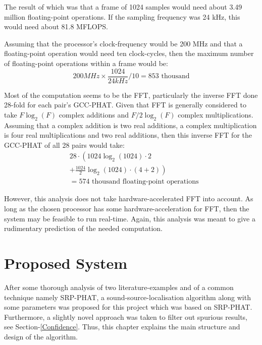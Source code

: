 \documentclass[notitlepage]{report}
\begin{document}
The result of which was that a frame of 1024 samples would need about 3.49 million floating-point operations. If the sampling frequency was 24 \si{kHz}, this would need about 81.8 MFLOPS.

Assuming that the processor's clock-frequency would be 200 \si{MHz} and that a floating-point operation would need ten clock-cycles, then the maximum number of floating-point operations within a frame would be:
\begin{equation}
200 \si{MHz} \times \frac{1024}{24 \si{kHz}} / 10 = 853 \text{ thousand}
\end{equation}

Most of the computation seems to be the FFT, particularly the inverse FFT done 28-fold for each pair's GCC-PHAT. Given that FFT is generally considered to take $F \log_2(F)$ complex additions and $F/2 \log_2(F)$ complex multiplications. Assuming that a complex addition is two real additions, a complex multiplication is four real multiplications and two real additions, then this inverse FFT for the GCC-PHAT of all 28 pairs would take:
\begin{equation}
\begin{split}
&28 \cdot \left( 1024 \log_2(1024) \cdot 2 \right. \\
&\left. + \frac{1024}{2} \log_2(1024) \cdot (4+2) \right) \\
&= 574 \text{ thousand floating-point operations}
\end{split}
\end{equation}

However, this analysis does not take hardware-accelerated FFT into account. As long as the chosen processor has some hardware-acceleration for FFT, then the system may be feasible to run real-time. Again, this analysis was meant to give a rudimentary prediction of the needed computation.

\chapter{Proposed System}

After some thorough analysis of two literature-examples and of a common technique namely SRP-PHAT\cite{valin_localization_2004}\cite{valin_robust_2007}\cite{manamperi_drone_2022}\cite{salvati_power_2019}\cite{basiri_-board_2016}, a sound-source-localisation algorithm along with some parameters was proposed for this project which was based on SRP-PHAT. Furthermore, a slightly novel approach was taken to filter out spurious results, see Section-\ref{Confidence}. Thus, this chapter explains the main structure and design of the algorithm.
\end{document}
